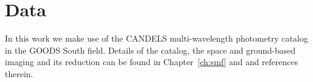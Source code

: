 \section{Data}\label{sec:data}
In this work we make use of the CANDELS multi-wavelength photometry catalog in the GOODS South field. Details of the catalog, the space and ground-based imaging and its reduction can be found in Chapter~\ref{ch:smf} and \citet{Guo:2013ig} and references therein.

%
%
%
